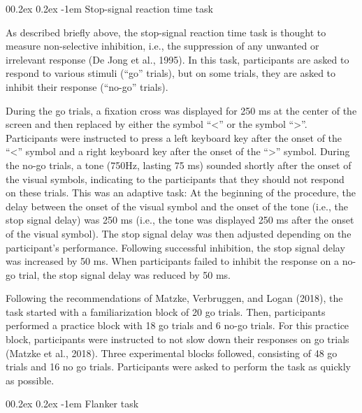 \documentclass[
  man,floatsintext]{apa6}
\makeatletter
\let\oldparagraph\paragraph
\renewcommand{\paragraph}[1]{\oldparagraph{#1}\mbox{}}
\renewcommand{\paragraph}{\@startsection{paragraph}{4}{\parindent}%
  {0\baselineskip \@plus 0.2ex \@minus 0.2ex}%
  {-1em}%
  {\normalfont\normalsize\bfseries\itshape\typesectitle}}
\makeatother
\begin{document}
\hypertarget{stop-signal-reaction-time-task}{%
\paragraph{Stop-signal reaction time task}\label{stop-signal-reaction-time-task}}

As described briefly above, the stop-signal reaction time task is thought to measure non-selective inhibition, i.e., the suppression of any unwanted or irrelevant response (De Jong et al., 1995). In this task, participants are asked to respond to various stimuli (``go'' trials), but on some trials, they are asked to inhibit their response (``no-go'' trials).

During the go trials, a fixation cross was displayed for 250 ms at the center of the screen and then replaced by either the symbol ``\textless{}'' or the symbol ``\textgreater{}''. Participants were instructed to press a left keyboard key after the onset of the ``\textless{}'' symbol and a right keyboard key after the onset of the ``\textgreater{}'' symbol. During the no-go trials, a tone (750Hz, lasting 75 ms) sounded shortly after the onset of the visual symbols, indicating to the participants that they should not respond on these trials. This was an adaptive task: At the beginning of the procedure, the delay between the onset of the visual symbol and the onset of the tone (i.e., the stop signal delay) was 250 ms (i.e., the tone was displayed 250 ms after the onset of the visual symbol). The stop signal delay was then adjusted depending on the participant's performance. Following successful inhibition, the stop signal delay was increased by 50 ms. When participants failed to inhibit the response on a no-go trial, the stop signal delay was reduced by 50 ms.

Following the recommendations of Matzke, Verbruggen, and Logan (2018), the task started with a familiarization block of 20 go trials. Then, participants performed a practice block with 18 go trials and 6 no-go trials. For this practice block, participants were instructed to not slow down their responses on go trials (Matzke et al., 2018). Three experimental blocks followed, consisting of 48 go trials and 16 no go trials. Participants were asked to perform the task as quickly as possible.

\hypertarget{flanker-task}{%
\paragraph{Flanker task}\label{flanker-task}}
\end{document}

